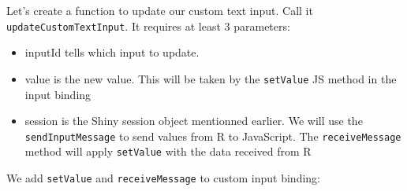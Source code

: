 \documentclass[]{book}
\newenvironment{Shaded}{\begin{snugshade}}{\end{snugshade}}
\newcommand{\ControlFlowTok}[1]{\textcolor[rgb]{0.13,0.29,0.53}{\textbf{#1}}}
\newcommand{\DataTypeTok}[1]{\textcolor[rgb]{0.13,0.29,0.53}{#1}}
\newcommand{\KeywordTok}[1]{\textcolor[rgb]{0.13,0.29,0.53}{\textbf{#1}}}
\newcommand{\NormalTok}[1]{#1}
\newcommand{\OperatorTok}[1]{\textcolor[rgb]{0.81,0.36,0.00}{\textbf{#1}}}
\newcommand{\OtherTok}[1]{\textcolor[rgb]{0.56,0.35,0.01}{#1}}
\newcommand{\StringTok}[1]{\textcolor[rgb]{0.31,0.60,0.02}{#1}}
\providecommand{\tightlist}{%
  \setlength{\itemsep}{0pt}\setlength{\parskip}{0pt}}
\begin{document}
Let's create a function to update our custom text input. Call it \texttt{updateCustomTextInput}. It requires at least 3 parameters:

\begin{itemize}
\tightlist
\item
  inputId tells which input to update.
\item
  value is the new value. This will be taken by the \texttt{setValue} JS method in the input binding
\item
  session is the Shiny session object mentionned earlier. We will use the \texttt{sendInputMessage} to send values from R to JavaScript. The \texttt{receiveMessage} method will apply \texttt{setValue} with the data received from R
\end{itemize}

\begin{Shaded}
\end{Shaded}

We add \texttt{setValue} and \texttt{receiveMessage} to custom input binding:
\end{document}
